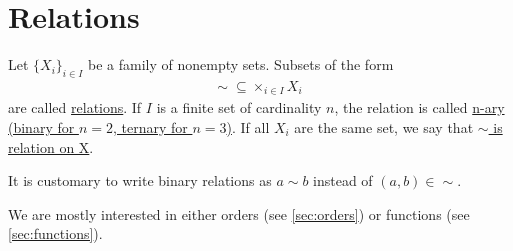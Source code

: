 \section{Relations}\label{sec:relations}

\begin{definition}\label{def:relation}
  Let $\{ X_i \}_{i \in I}$ be a family of nonempty sets.
  Subsets of the form
  \begin{align*}
    \sim\; \subseteq \times_{i \in I} X_i
  \end{align*}
  are called \ul{relations}. If $I$ is a finite set of cardinality $n$, the relation is called \ul{n-ary (binary for $n = 2$, ternary for $n = 3$)}. If all $X_i$ are the same set, we say that \ul{$\sim$ is relation on X}.

  It is customary to write binary relations as $a \sim b$ instead of $(a, b) \in \sim$.
\end{definition}

\begin{note}\label{note:main_relation_types}
  We are mostly interested in either orders (see \cref{sec:orders}) or functions (see \cref{sec:functions}).
\end{note}

